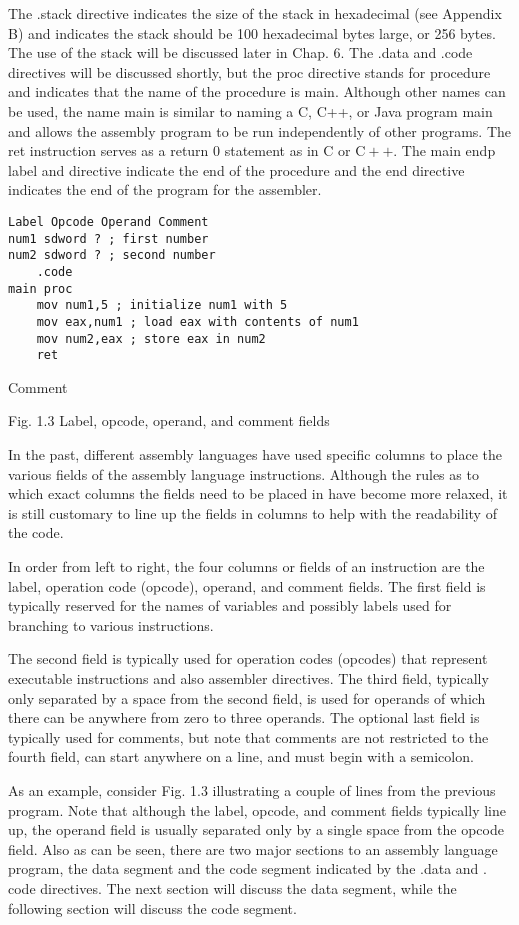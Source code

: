 \documentclass[10pt]{article}
\begin{document}
The .stack directive indicates the size of the stack in hexadecimal (see Appendix B) and indicates the stack should be 100 hexadecimal bytes large, or 256 bytes. The use of the stack will be discussed later in Chap. 6. The .data and .code directives will be discussed shortly, but the proc directive stands for procedure and indicates that the name of the procedure is main. Although other names can be used, the name main is similar to naming a C, C++, or Java program main and allows the assembly program to be run independently of other programs. The ret instruction serves as a return 0 statement as in C or $\mathrm{C}++$. The main endp label and directive indicate the end of the procedure and the end directive indicates the end of the program for the assembler.

\begin{verbatim}
Label Opcode Operand Comment
num1 sdword ? ; first number
num2 sdword ? ; second number
    .code
main proc
    mov num1,5 ; initialize num1 with 5
    mov eax,num1 ; load eax with contents of num1
    mov num2,eax ; store eax in num2
    ret
\end{verbatim}

Comment

Fig. 1.3 Label, opcode, operand, and comment fields

In the past, different assembly languages have used specific columns to place the various fields of the assembly language instructions. Although the rules as to which exact columns the fields need to be placed in have become more relaxed, it is still customary to line up the fields in columns to help with the readability of the code.

In order from left to right, the four columns or fields of an instruction are the label, operation code (opcode), operand, and comment fields. The first field is typically reserved for the names of variables and possibly labels used for branching to various instructions.

The second field is typically used for operation codes (opcodes) that represent executable instructions and also assembler directives. The third field, typically only separated by a space from the second field, is used for operands of which there can be anywhere from zero to three operands. The optional last field is typically used for comments, but note that comments are not restricted to the fourth field, can start anywhere on a line, and must begin with a semicolon.

As an example, consider Fig. 1.3 illustrating a couple of lines from the previous program. Note that although the label, opcode, and comment fields typically line up, the operand field is usually separated only by a single space from the opcode field. Also as can be seen, there are two major sections to an assembly language program, the data segment and the code segment indicated by the .data and . code directives. The next section will discuss the data segment, while the following section will discuss the code segment.
\end{document}
